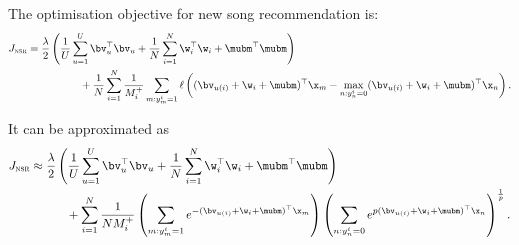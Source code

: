 The optimisation objective for new song recommendation is:
\begin{equation}
\label{eq:primal_nsr}
\begin{aligned}
J_\textsc{nsr}
&= \frac{\lambda}{2} \left( \frac{1}{U} \sum_{u=1}^U \bv_u^\top \bv_u 
     + \frac{1}{N} \sum_{i=1}^N \w_i^\top \w_i + \mubm^\top \mubm \right) \\
& \hspace{5em}
     + \frac{1}{N} \sum_{i=1}^N \frac{1}{M_i^+} \sum_{m: y_m^i = 1} \ell \left( (\bv_{u(i)} + \w_i + \mubm)^\top \x_m 
     - \max_{n: y_n^i = 0} (\bv_{u(i)} + \w_i + \mubm)^\top \x_n \right).
\end{aligned}
\end{equation}

It can be approximated as
\begin{equation*}
\begin{aligned}
J_\textsc{nsr} 
&\approx \frac{\lambda}{2} \left( \frac{1}{U} \sum_{u=1}^U \bv_u^\top \bv_u + \frac{1}{N} \sum_{i=1}^N \w_i^\top \w_i + \mubm^\top \mubm \right) \\
& \hspace{3em}
  + \sum_{i=1}^N \frac{1}{N M_i^+} 
    \left( \sum_{m: y_m^i = 1} e^{-(\bv_{u(i)} + \w_i + \mubm)^\top \x_m} \right)
    \left( \sum_{n: y_n^i = 0} e^{p (\bv_{u(i)} + \w_i + \mubm)^\top \x_n} \right)^\frac{1}{p}.
\end{aligned}
\end{equation*}

